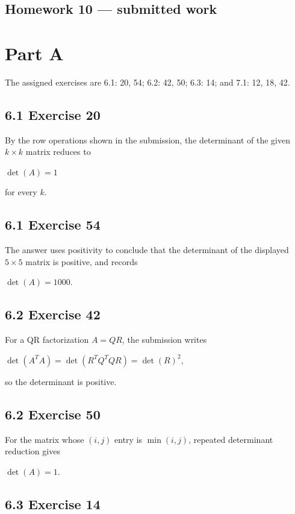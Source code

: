 \section{Homework 10 --- submitted work}

\chapter{Part A}

The assigned exercises are 6.1: 20, 54; 6.2: 42, 50; 6.3: 14; and 7.1: 12, 18, 42.

\section{6.1 Exercise 20}

By the row operations shown in the submission, the determinant of the given \(k \times k\) matrix reduces to

\(\det(A) = 1\)

for every \(k\).

\section{6.1 Exercise 54}

The answer uses positivity to conclude that the determinant of the displayed \(5 \times 5\) matrix is positive, and records

\(\det(A) = 1000.\)

\section{6.2 Exercise 42}

For a QR factorization \(A = QR\), the submission writes

\(\det\left( {A^{T}A} \right) = \det\left( {R^{T}Q^{T}QR} \right) = {\det(R)}^{2},\)

so the determinant is positive.

\section{6.2 Exercise 50}

For the matrix whose \(\left( {i,j} \right)\) entry is \(\min\left( {i,j} \right)\), repeated determinant reduction gives

\(\det(A) = 1.\)

\section{6.3 Exercise 14}

